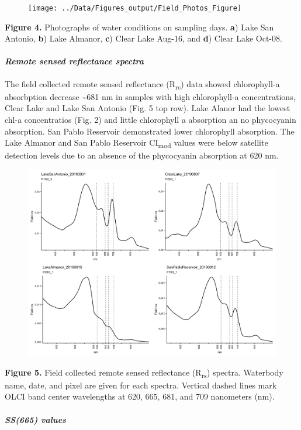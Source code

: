 \documentclass[
]{article}
\begin{document}
\begin{figure}
\texttt{[image: ../Data/Figures\_output/Field\_Photos\_Figure]} \end{figure}

\textbf{Figure 4.} Photographs of water conditions on sampling days.
\textbf{a}) Lake San Antonio, \textbf{b}) Lake Almanor, \textbf{c})
Clear Lake Aug-16, and \textbf{d}) Clear Lake Oct-08.

\hypertarget{remote-sensed-reflectance-spectra}{%
\paragraph{\texorpdfstring{\emph{Remote sensed reflectance
spectra}}{Remote sensed reflectance spectra}}\label{remote-sensed-reflectance-spectra}}

The field collected remote sensed reflectance (R\textsubscript{rs}) data
showed chlorophyll-a absorbption decrease \textasciitilde681 nm in
samples with high chlorophyll-a concentrations, Clear Lake and Lake San
Antonio (Fig. 5 top row). Lake Alanor had the lowest chl-a concentratios
(Fig. 2) and little chlorophyll a absorption an no phycocyanin
absorption. San Pablo Reservoir demonstrated lower chlorophyll
absorption. The Lake Almanor and San Pablo Reservoir
CI\textsubscript{mod} values were below satellite detection levels due
to an absence of the phycocyanin absorption at 620 nm.

\begin{figure}
\includegraphics[width=0.5\linewidth]{../Data/Figures_output/RRS_Spectra_Figure} \end{figure}

\textbf{Figure 5.} Field collected remote sensed reflectance
(R\textsubscript{rs}) spectra. Waterbody name, date, and pixel are given
for each spectra. Vertical dashed lines mark OLCI band center
wavelengths at 620, 665, 681, and 709 nanometers (nm).

\hypertarget{ss665-values}{%
\paragraph{\texorpdfstring{\emph{SS(665)
values}}{SS(665) values}}\label{ss665-values}}
\end{document}
